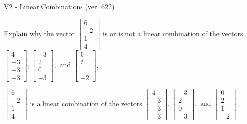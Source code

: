 \begin{exercise}
  \begin{exerciseTitle}V2 - Linear Combinations (ver. 622)\end{exerciseTitle}
  \begin{exerciseStatement}
    Explain why the vector \(\left[\begin{array}{c}
6 \\
-2 \\
1 \\
4
\end{array}\right]\)  is or is not a linear 
	combination of the vectors \(\left[\begin{array}{c}
4 \\
-3 \\
-3 \\
-3
\end{array}\right] , \left[\begin{array}{c}
-3 \\
2 \\
0 \\
-3
\end{array}\right] , \text{ and } \left[\begin{array}{c}
0 \\
2 \\
1 \\
-2
\end{array}\right]\).
	


  \end{exerciseStatement}
  \begin{exerciseAnswer}
   \(\left[\begin{array}{c}
6 \\
-2 \\
1 \\
4
\end{array}\right]\) 
  	 is  
	a linear combination of the vectors \(\left[\begin{array}{c}
4 \\
-3 \\
-3 \\
-3
\end{array}\right] , \left[\begin{array}{c}
-3 \\
2 \\
0 \\
-3
\end{array}\right] , \text{ and } \left[\begin{array}{c}
0 \\
2 \\
1 \\
-2
\end{array}\right]\).

	
  


  \end{exerciseAnswer}
\end{exercise}
